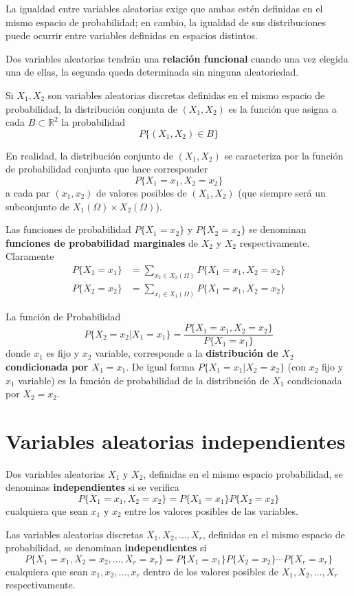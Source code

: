 \documentclass[12pt,a4paper,twoside]{memoir}
\renewcommand{\emph}[1]{\textbf{#1}}
\newcommand{\R}{\mathbb{R}}
\theoremstyle{mystyle}
\begin{document}
La igualdad entre variables aleatorias exige que ambas estén definidas en el mismo espacio de probabilidad; en cambio, la igualdad de sus distribuciones puede ocurrir entre variables definidas en espacios distintos.

Dos variables aleatorias tendrán una \emph{relación funcional} cuando una vez elegida una de ellas, la segunda queda determinada sin ninguna aleatoriedad.

Si \(X_1, X_2\) son variables aleatorias discretas definidas en el mismo espacio de probabilidad, la distribución conjunta de \((X_1, X_2)\) es la función que asigna a cada $B \subset \R^2$ la probabilidad
\[
P\{(X_1,X_2) \in B \}
\]

En realidad, la distribución conjunto de $(X_1,X_2)$ se caracteriza por la función de probabilidad conjunta que hace corresponder
\[
P\{X_1=x_1, X_2=x_2\}
\]
a cada par $(x_1,x_2)$ de valores posibles de $(X_1,X_2)$ (que siempre será un subconjunto de $X_1(\Omega) \times X_2(\Omega)$).

Las funciones de probabilidad $P\{X_1 = x_2\}$ y $P\{X_2 = x_2\}$ se denominan \emph{funciones de probabilidad marginales} de $X_2$ y $X_2$ respectivamente. Claramente
\begin{align*}
  P\{X_1 = x_1\} &= \sum_{x_2 \in X_2(\Omega)} P\{X_1 = x_1, X_2 = x_2\} \\
  P\{X_2 = x_2\} &= \sum_{x_1 \in X_1(\Omega)} P\{X_1 = x_1, X_2 = x_2\}
\end{align*}

La función de Probabilidad
\[
P\{X_2 = x_2 | X_1 = x_1\} = \frac{P\{X_1 = x_1, X_2 = x_2\}}{P\{X_1 = x_1\}}
\]
donde $x_1$ es fijo y $x_2$ variable, corresponde a la \emph{distribución de $X_2$ condicionada por $X_1 = x_1$}. De igual forma $P\{X_1 = x_1 | X_2 = x_2\}$ (con $x_2$ fijo y $x_1$ variable) es la función de probabilidad de la distribución de $X_1$ condicionada por $X_2 = x_2$.

\section{Variables aleatorias independientes}

Dos variables aleatorias $X_1$ y $X_2$, definidas en el mismo espacio probabilidad, se denominas \emph{independientes} si se verifica
\[
P\{X_1 = x_1, X_2 = x_2\} = P\{X_1 = x_1\}P\{X_2 = x_2\}
\]
cualquiera que sean $x_1$ y $x_2$ entre los valores posibles de las variables.

Las variables aleatorias discretas $X_1,X_2,\ldots,X_r$, definidas en el mismo espacio de probabilidad, se denominan \emph{independientes} si
\[
P\{X_1 = x_1, X_2 = x_2,\ldots,X_r=x_r\} = P\{X_1 = x_1\}P\{X_2 = x_2\} \cdots P\{X_r = x_r\}
\]
cualquiera que sean $x_1,x_2,\ldots,x_r$ dentro de los valores posibles de $X_1,X_2,\ldots,X_r$ respectivamente.
\end{document}

